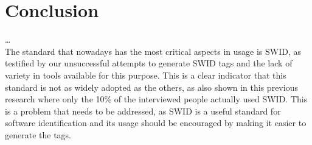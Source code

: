 \section{Conclusion}
\dots
\\ The standard that nowadays has the most critical aspects in usage is SWID, as testified by our unsuccessful attempts to generate SWID tags and the lack of variety in tools available for this purpose. 
This is a clear indicator that this standard is not as widely adopted as the others, as also shown in this previous research \cite{article:software-bom} where only the 10\% of the interviewed people actually used SWID. 
This is a problem that needs to be addressed, as SWID is a useful standard for software identification and its usage should be encouraged by making it easier to generate the tags.  